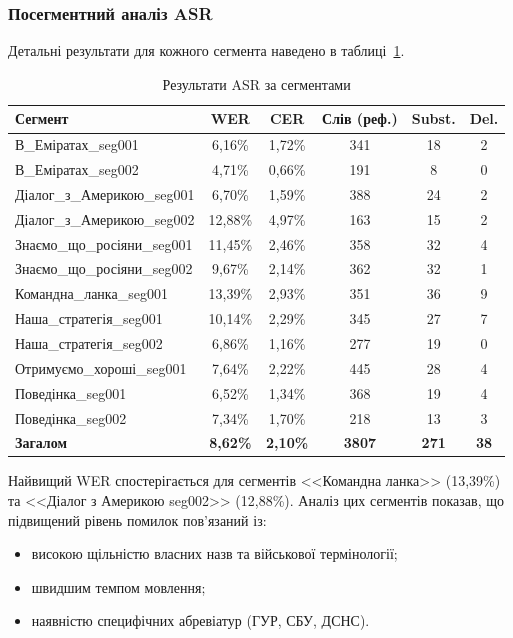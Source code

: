 \subsubsection{Посегментний аналіз ASR}

Детальні результати для кожного сегмента наведено в таблиці~\ref{tab:asr_detailed}.

\begin{table}[h]
\centering
\caption{Результати ASR за сегментами}
\label{tab:asr_detailed}
\small
\begin{tabular}{|l|c|c|c|c|c|}
\hline
\textbf{Сегмент} & \textbf{WER} & \textbf{CER} & \textbf{Слів (реф.)} & \textbf{Subst.} & \textbf{Del.} \\
\hline
В\_Еміратах\_seg001 & 6,16\% & 1,72\% & 341 & 18 & 2 \\
В\_Еміратах\_seg002 & 4,71\% & 0,66\% & 191 & 8 & 0 \\
Діалог\_з\_Америкою\_seg001 & 6,70\% & 1,59\% & 388 & 24 & 2 \\
Діалог\_з\_Америкою\_seg002 & 12,88\% & 4,97\% & 163 & 15 & 2 \\
Знаємо\_що\_росіяни\_seg001 & 11,45\% & 2,46\% & 358 & 32 & 4 \\
Знаємо\_що\_росіяни\_seg002 & 9,67\% & 2,14\% & 362 & 32 & 1 \\
Командна\_ланка\_seg001 & 13,39\% & 2,93\% & 351 & 36 & 9 \\
Наша\_стратегія\_seg001 & 10,14\% & 2,29\% & 345 & 27 & 7 \\
Наша\_стратегія\_seg002 & 6,86\% & 1,16\% & 277 & 19 & 0 \\
Отримуємо\_хороші\_seg001 & 7,64\% & 2,22\% & 445 & 28 & 4 \\
Поведінка\_seg001 & 6,52\% & 1,34\% & 368 & 19 & 4 \\
Поведінка\_seg002 & 7,34\% & 1,70\% & 218 & 13 & 3 \\
\hline
\textbf{Загалом} & \textbf{8,62\%} & \textbf{2,10\%} & \textbf{3807} & \textbf{271} & \textbf{38} \\
\hline
\end{tabular}
\end{table}

Найвищий WER спостерігається для сегментів <<Командна ланка>> (13,39\%)
та <<Діалог з Америкою seg002>> (12,88\%). Аналіз цих сегментів показав,
що підвищений рівень помилок пов'язаний із:
\begin{itemize}
    \item високою щільністю власних назв та військової термінології;
    \item швидшим темпом мовлення;
    \item наявністю специфічних абревіатур (ГУР, СБУ, ДСНС).
\end{itemize}

